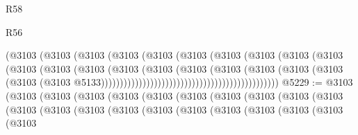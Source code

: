 \begin{lexlean}{R58}
\begin{lexlean}{R56}
\begin{coremodule}
{{{{{{{{{{{{{{{{{{{{{{{{{{{{{{{{{{{{{{{{{{{{{{{{{{{{{{{{{{{{{{{{{{{{{{{{{{{{{{{{{{{{{{{{{{{{{{{{{{{{{{{{{{{{{{{{{{{{{{{{{{{{{{{{{{{{{{{{{{{{{{{{{{{{{{{{{{{{{{{{{{{{{{{{{{{{{{{{{{{{{{{{{{{{{{{{{{{{{{{{{{{{{{{{{{{                                                      (@3103
                                                        (@3103
                                                          (@3103
                                                            (@3103
                                                              (@3103
                                                                (@3103
                                                                  (@3103
                                                                    (@3103
                                                                      (@3103
                                                                        (@3103
                                                                          (@3103
                                                                            (@3103
                                                                              (@3103
                                                                                (@3103
                                                                                  (@3103
                                                                                    (@3103
                                                                                      (@3103
                                                                                        (@3103
                                                                                          (@3103
                                                                                            (@3103
                                                                                              (@3103
                                                                                                (@3103
                                                                                                  @5133)))))))))))))))))))))))))))))))))))))))))))))))
@5229 := @3103
    (@3103
      (@3103
        (@3103
          (@3103
            (@3103
              (@3103
                (@3103
                  (@3103
                    (@3103
                      (@3103
                        (@3103
                          (@3103
                            (@3103
                              (@3103
                                (@3103
                                  (@3103
                                    (@3103
                                      (@3103
                                        (@3103
                                          (@3103
                                            (@3103
}}}}}}}}}}}}}}}}}}}}}}}}}}}}}}}}}}}}}}}}}}}}}}}}}}}}}}}}}}}}}}}}}}}}}}}}}}}}}}}}}}}}}}}}}}}}}}}}}}}}}}}}}}}}}}}}}}}}}}}}}}}}}}}}}}}}}}}}}}}}}}}}}}}}}}}}}}}}}}}}}}}}}}}}}}}}}}}}}}}}}}}}}}}}}}}}}}}}}}}}}}}}}}}}}}}
\end{coremodule}
\end{lexlean}
\end{lexlean}
